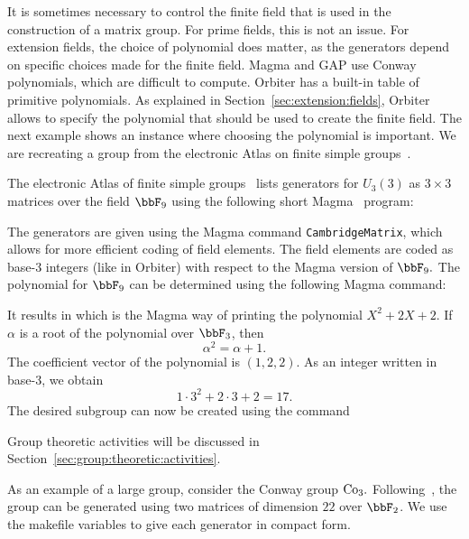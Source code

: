 

It is sometimes necessary to control the finite field 
that is used in the construction of a matrix group.
For prime fields, this is not an issue. 
For extension fields, the choice of polynomial does matter, as 
the generators depend on specific choices made for the finite field. 
Magma and GAP use Conway polynomials, which are difficult to compute.
Orbiter has a built-in table of primitive polynomials. 
As explained in Section~\ref{sec:extension:fields},
Orbiter allows to specify the polynomial that should be used to create the finite field.
The next example shows an instance where choosing 
the polynomial is important. 
We are recreating a group 
from the electronic Atlas on finite simple groups~\cite{Atlas3}.

\bigskip

The electronic Atlas of finite simple groups~\cite{Atlas3} 
lists generators for $U_3(3)$ as $3 \times 3$ matrices over the field $\bbF_9$
using the following short Magma~\cite{Magma} program:


The generators are given using the Magma command \verb'CambridgeMatrix', 
which allows for more efficient coding of field elements.
The field elements are coded as base-3 integers (like in Orbiter) 
with respect to the Magma version of $\bbF_9.$ 
The polynomial for $\bbF_9$ can be determined using the 
following Magma command: 


It results in
which is the Magma way of printing the polynomial $X^2+2X+2.$ 
If $\alpha$ is a root of the polynomial over $\bbF_3$, then
$$
\alpha^2 = \alpha+1.
$$
The coefficient vector of 
the polynomial is $(1,2,2).$ 
As an integer written in base-3, we 
obtain 
$$
1\cdot 3^2 + 2 \cdot 3 + 2 = 17.
$$
The desired subgroup can now be created using the command


Group theoretic activities 
will be discussed in Section~\ref{sec:group:theoretic:activities}.

\bigskip

As an example of a large group, consider the Conway group ${\rm Co}_3.$ 
Following~\cite{SuleimanWilson1997}, the group can be generated using two 
matrices of dimension $22$ over $\bbF_2$. 
We use the makefile variables to give each generator in compact form. 

